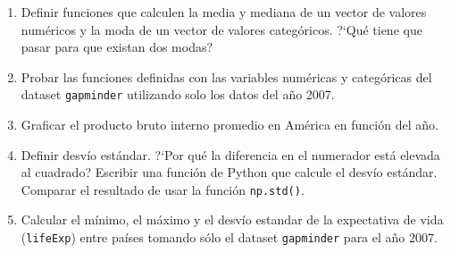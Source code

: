 \documentclass[a4paper,11pt]{article}
\theoremstyle{definition}
\begin{document}
\begin{enumerate}[resume]
\item Definir funciones que calculen la media y mediana de un vector de valores numéricos y la moda de un vector de valores categóricos. ?`Qu\'e tiene que pasar para que existan dos modas?

\item Probar las funciones definidas con las variables numéricas y categóricas del dataset \lstinline{gapminder} utilizando solo los datos del año 2007.

\item Graficar el producto bruto interno promedio en América en función del año.

\item Definir desv\'io est\'andar. ?`Por qu\'e la diferencia en el numerador est\'a elevada al cuadrado? Escribir una funci\'on de Python que calcule el desv\'io est\'andar. Comparar el resultado de usar la funci\'on \lstinline{np.std()}.

\item Calcular el mínimo, el máximo y el desv\'io estandar de la expectativa de vida (\lstinline{lifeExp}) entre pa\'ises tomando s\'olo el dataset \lstinline{gapminder} para el a\~no 2007.
\end{enumerate}

%
%
%
%
\end{document}
